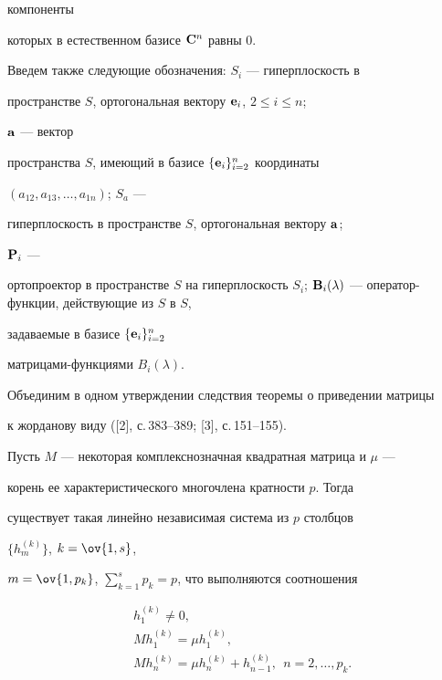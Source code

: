 компоненты 


которых в естественном базисе $\bold C^n$ равны 0. 


 


Введем также следующие обозначения: $S_i$ --- гиперплоскость в 


пространстве $S$, ортогональная вектору $\bold e_i$, $2\le i\le n$; 


$\bold a$ --- вектор 


пространства $S$, имеющий в базисе $\{\bold e_i\}^n_{i=2}$ координаты 


$(a_{12},a_{13},\dotsc,a_{1n})$; $S_a$ --- 


гиперплоскость в пространстве $S$, ортогональная вектору $\bold a$; 


$\bold P_i$ --- 


ортопроектор в пространстве $S$ на гиперплоскость $S_i$; $\bold 


B_i(\lambda)$ --- оператор-функции, действующие из $S$ в $S$, 


задаваемые в базисе $\{\bold e_i\}^n_{i=2}$ 


матрицами-функциями $B_i(\lambda)$. 


 


Объединим в одном утверждении следствия теоремы о приведении матрицы 


к жорданову виду ([2], с.\,383--389; [3], с.\,151--155). 


 


\begin{lem} 


Пусть $M$ --- некоторая комплекснозначная квадратная матрица и $\mu$ --- 


корень ее характеристического многочлена кратности $p$. Тогда 


существует такая линейно независимая система из $p$ столбцов 


$\{h^{(k)}_m\}$, $k=\ov{1,s}$, 


$m=\ov{1,p_k}$, $\sum\limits^s_{k=1}p_k=p$, что выполняются соотношения 


\begin{align*} 


& h^{(k)}_1\ne 0,\\ 


& M h^{(k)}_1=\mu h^{(k)}_1,\\ 


& M h^{(k)}_n=\mu h^{(k)}_n+h^{(k)}_{n-1}, 


\ \ n=2,\dotsc,p_k. 


\end{align*} 


\end{lem} 



